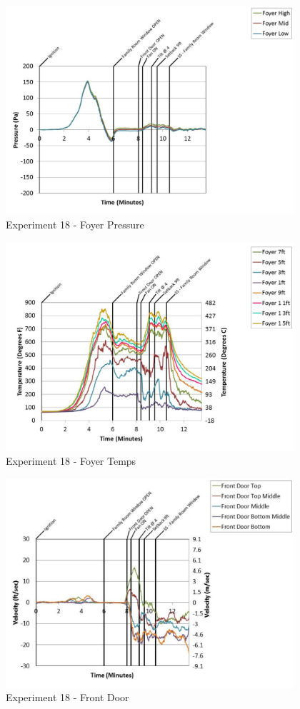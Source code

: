\documentclass{article}
\begin{document}
\begin{appendices}
	\begin{figure}[h!]
		\centering
		\includegraphics[height=3.05in]{0_Images/Results_Charts/Exp_18_Charts/FoyerPressure.pdf}
		\caption{Experiment 18 - Foyer Pressure}
	\end{figure}
 
	\clearpage

	\begin{figure}[h!]
		\centering
		\includegraphics[height=3.05in]{0_Images/Results_Charts/Exp_18_Charts/FoyerTemps.pdf}
		\caption{Experiment 18 - Foyer Temps}
	\end{figure}
 

	\begin{figure}[h!]
		\centering
		\includegraphics[height=3.05in]{0_Images/Results_Charts/Exp_18_Charts/FrontDoor.pdf}
		\caption{Experiment 18 - Front Door}
	\end{figure}
 

\end{appendices}
\end{document}
